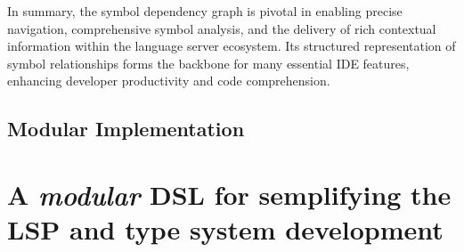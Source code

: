 In summary, the symbol dependency graph is pivotal in enabling precise navigation, comprehensive symbol analysis, and the delivery of rich contextual information within the language server ecosystem. Its structured representation of symbol relationships forms the backbone for many essential IDE features, enhancing developer productivity and code comprehension.

\subsection{Modular Implementation}\label{subsec:concept:ModularImplementation}



\section{A \textit{modular} DSL for semplifying the LSP and type system development}\label{sec:concept:AModularDSLForSemplifyingTheLSPAndTypeSystemDevelopment}

